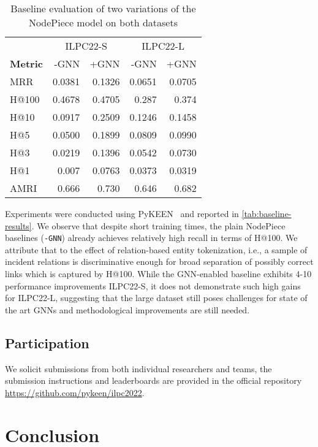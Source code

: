 \documentclass[sigconf,screen]{acmart}
\begin{document}
\begin{table}[]
    \centering
    \begin{tabular}{lrr|rr}
        \toprule
         & \multicolumn{2}{c}{ILPC22-S} & \multicolumn{2}{c}{ILPC22-L} \\
        \textbf{Metric} & -GNN & +GNN               & -GNN & +GNN \\
        \midrule
        MRR   & 0.0381 & 0.1326 & 0.0651 & 0.0705\\
        H@100 & 0.4678 & 0.4705 & 0.287  & 0.374\\
        H@10  & 0.0917 & 0.2509	& 0.1246 & 0.1458\\
        H@5   & 0.0500 & 0.1899	& 0.0809 & 0.0990\\
        H@3   & 0.0219 & 0.1396	& 0.0542 & 0.0730\\
        H@1   & 0.007  & 0.0763	& 0.0373 & 0.0319\\
AMRI  & 0.666  & 0.730	& 0.646  & 0.682\\
        \bottomrule
    \end{tabular}
    \caption{Baseline evaluation of two variations of the NodePiece model on both datasets}
    \label{tab:baseline-results}
\end{table}

Experiments were conducted using PyKEEN~\cite{pykeen} and reported in  \autoref{tab:baseline-results}.
We observe that despite short training times, the plain NodePiece baselines (\texttt{-GNN}) already achieves relatively high recall in terms of H@100.
We attribute that to the effect of relation-based entity tokenization, i.e., a sample of incident relations is discriminative enough for broad separation of possibly correct links which is captured by H@100. 
While the GNN-enabled baseline exhibits 4-10 performance improvements ILPC22-S, it does not demonstrate such high gains for ILPC22-L, suggesting that the large dataset still poses challenges for state of the art GNNs and methodological improvements are still needed.

\subsection{Participation}

We solicit submissions from both individual researchers and teams, the submission instructions and leaderboards are provided in the official repository \url{https://github.com/pykeen/ilpc2022}. 

\section{Conclusion}
\end{document}
